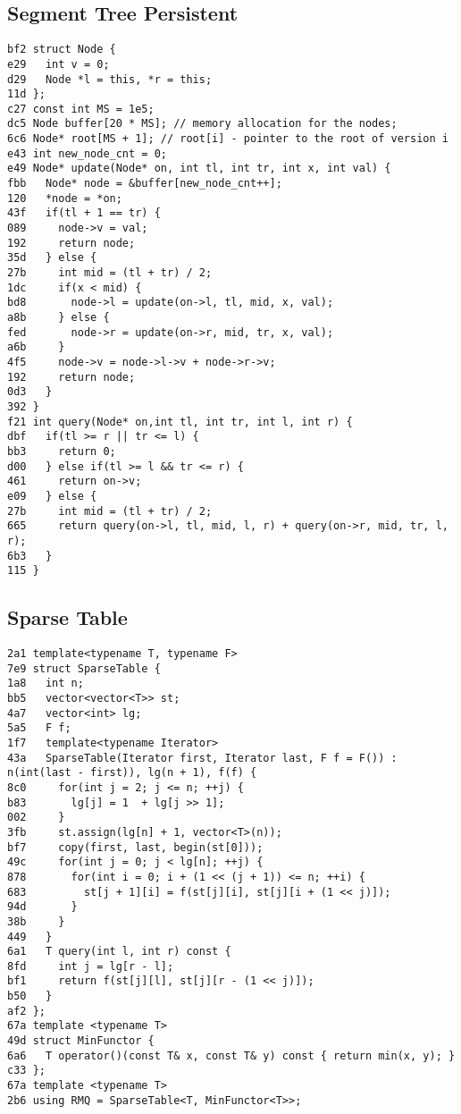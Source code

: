 \documentclass[10pt, a4paper, twoside]{article}
\begin{document}
\subsection{Segment Tree Persistent}
\begin{lstlisting}
bf2 struct Node {
e29   int v = 0;
d29   Node *l = this, *r = this;
11d };
c27 const int MS = 1e5;	
dc5 Node buffer[20 * MS]; // memory allocation for the nodes;
6c6 Node* root[MS + 1]; // root[i] - pointer to the root of version i
e43 int new_node_cnt = 0;
e49 Node* update(Node* on, int tl, int tr, int x, int val) {
fbb   Node* node = &buffer[new_node_cnt++];
120   *node = *on;
43f   if(tl + 1 == tr) {
089     node->v = val;
192     return node;
35d   } else {
27b     int mid = (tl + tr) / 2;
1dc     if(x < mid) {
bd8       node->l = update(on->l, tl, mid, x, val);
a8b     } else {
fed       node->r = update(on->r, mid, tr, x, val);
a6b     } 
4f5     node->v = node->l->v + node->r->v;
192     return node;
0d3   }
392 }
f21 int query(Node* on,int tl, int tr, int l, int r) {
dbf   if(tl >= r || tr <= l) {
bb3     return 0;
d00   } else if(tl >= l && tr <= r) {
461     return on->v;
e09   } else {
27b     int mid = (tl + tr) / 2;
665     return query(on->l, tl, mid, l, r) + query(on->r, mid, tr, l, r);
6b3   }
115 }
\end{lstlisting}

\subsection{Sparse Table
}
\begin{lstlisting}
2a1 template<typename T, typename F>
7e9 struct SparseTable {
1a8   int n;
bb5   vector<vector<T>> st;
4a7   vector<int> lg;
5a5   F f;
1f7   template<typename Iterator>
43a   SparseTable(Iterator first, Iterator last, F f = F()) : n(int(last - first)), lg(n + 1), f(f) {
8c0     for(int j = 2; j <= n; ++j) {
b83       lg[j] = 1  + lg[j >> 1];
002     }
3fb     st.assign(lg[n] + 1, vector<T>(n));
bf7     copy(first, last, begin(st[0]));
49c     for(int j = 0; j < lg[n]; ++j) {
878       for(int i = 0; i + (1 << (j + 1)) <= n; ++i) {
683         st[j + 1][i] = f(st[j][i], st[j][i + (1 << j)]);
94d       }
38b     }
449   }
6a1   T query(int l, int r) const {
8fd     int j = lg[r - l];
bf1     return f(st[j][l], st[j][r - (1 << j)]);
b50   }
af2 };
67a template <typename T>
49d struct MinFunctor {
6a6   T operator()(const T& x, const T& y) const { return min(x, y); }
c33 };
67a template <typename T>
2b6 using RMQ = SparseTable<T, MinFunctor<T>>;
\end{lstlisting}
\end{document}
